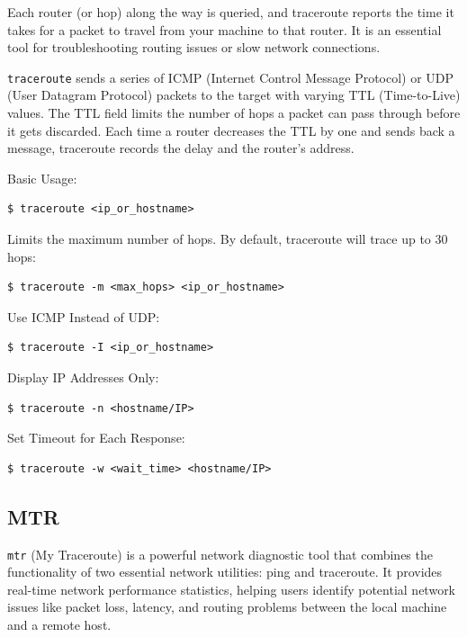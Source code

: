 \documentclass{article}
\newenvironment{codetemplate}[1][]{%
  \mybasecolorbox[#1]
  \itshape
}{%
  \endmybasecolorbox
}
\begin{document}
Each router (or hop) along the way is queried, and traceroute reports the time it takes for a packet to travel from your machine to that router. It is an essential tool for troubleshooting routing issues or slow network connections.

\verb|traceroute| sends a series of ICMP (Internet Control Message Protocol) or UDP (User Datagram Protocol) packets to the target with varying TTL (Time-to-Live) values. The TTL field limits the number of hops a packet can pass through before it gets discarded. Each time a router decreases the TTL by one and sends back a message, traceroute records the delay and the router's address.

Basic Usage:
\begin{codetemplate}{}
\begin{verbatim}
$ traceroute <ip_or_hostname>
\end{verbatim}
\end{codetemplate}

Limits the maximum number of hops. By default, traceroute will trace up to 30 hops:
\begin{codetemplate}{}
\begin{verbatim}
$ traceroute -m <max_hops> <ip_or_hostname>
\end{verbatim}
\end{codetemplate}

Use ICMP Instead of UDP:
\begin{codetemplate}{}
\begin{verbatim}
$ traceroute -I <ip_or_hostname>
\end{verbatim}
\end{codetemplate}

Display IP Addresses Only:
\begin{codetemplate}{}
\begin{verbatim}
$ traceroute -n <hostname/IP>
\end{verbatim}
\end{codetemplate}

Set Timeout for Each Response:
\begin{codetemplate}{}
\begin{verbatim}
$ traceroute -w <wait_time> <hostname/IP>
\end{verbatim}
\end{codetemplate}

\subsection{MTR}
\verb|mtr| (My Traceroute) is a powerful network diagnostic tool that combines the functionality of two essential network utilities: ping and traceroute. It provides real-time network performance statistics, helping users identify potential network issues like packet loss, latency, and routing problems between the local machine and a remote host.
\end{document}
